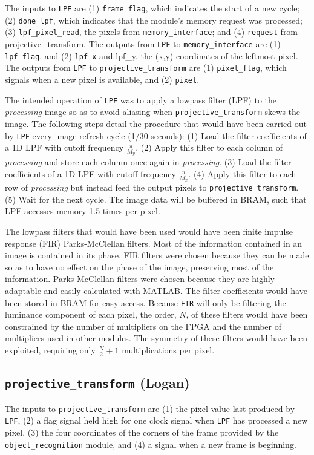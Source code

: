 \documentclass[10pt]{article}
\begin{document}
The inputs to {\tt LPF} are (1) {\tt frame\_flag}, which indicates the start of a new cycle; (2) {\tt done\_lpf}, which indicates that the module's memory request was processed; (3) {\tt lpf\_pixel\_read}, the pixels from {\tt memory\_interface}; and (4) {\tt request} from {projective\_transform}. The outputs from {\tt LPF} to {\tt memory\_interface} are (1) {\tt lpf\_flag}, and (2) {\tt lpf\_x} and {lpf\_y}, the (x,y) coordinates of the leftmost pixel. The outputs from {\tt LPF} to {\tt projective\_transform} are (1) {\tt pixel\_flag}, which signals when a new pixel is available, and (2) {\tt pixel}.

The intended operation of {\tt LPF} was to apply a lowpass filter (LPF) to the {\it processing} image so as to avoid aliasing when {\tt projective\_transform} skews the image. The following steps detail the procedure that would have been carried out by {\tt LPF} every image refresh cycle (1/30 seconds): (1) Load the filter coefficients of a 1D LPF with cutoff frequency \( \frac{\pi}{M_y} \). (2) Apply this filter to each column of {\it processing} and store each column once again in {\it processing}. (3) Load the filter coefficients of a 1D LPF with cutoff frequency \( \frac{\pi}{M_x} \). (4) Apply this filter to each row of {\it processing} but instead feed the output pixels to {\tt projective\_transform}. (5) Wait for the next cycle. The image data will be buffered in BRAM, such that LPF accesses memory 1.5 times per pixel.

The lowpass filters that would have been used would have been finite impulse response (FIR) Parks-McClellan filters. Most of the information contained in an image is contained in its phase. FIR filters were chosen because they can be made so as to have no effect on the phase of the image, preserving most of the information. Parks-McClellan filters were chosen because they are highly adaptable and easily calculated with MATLAB. The filter coefficients would have been stored in BRAM for easy access. Because {\tt FIR} will only be filtering the luminance component of each pixel, the order, \( N \), of these filters would have been constrained by the number of multipliers on the FPGA and the number of multipliers used in other modules. The symmetry of these filters would have been exploited, requiring only \( \frac{N}{2}+1 \) multiplications per pixel.

\subsection{{\tt projective\_transform} (Logan)}
The inputs to {\tt projective\_transform} are (1) the pixel value last produced by {\tt LPF}, (2) a flag signal held high for one clock signal when {\tt LPF} has processed a new pixel, (3) the four coordinates of the corners of the frame provided by the {\tt object\_recognition} module, and (4) a signal when a new frame is beginning.
\end{document}
